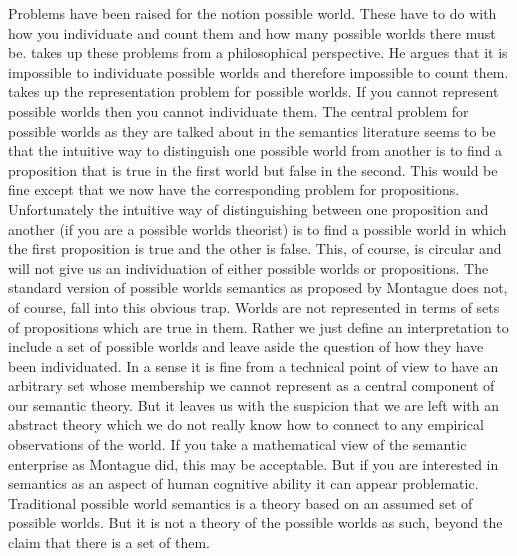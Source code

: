 Problems have been raised for the notion possible world. These have to
do with how you individuate and count them and how many possible
worlds there must be. \cite{Rescher1999} takes up these problems from
a philosophical perspective.  He argues that it is impossible to
individuate possible worlds and therefore impossible to count them.
\cite{Lappin2015} takes up the representation problem for possible
worlds.  If you cannot represent possible worlds then you cannot
individuate them.
The central problem for possible worlds as they are talked about in
the semantics literature seems to be that the intuitive way to
distinguish one possible world from another is to find a proposition
that is true in the first world but false in the second.  This would
be fine except that we now have the corresponding problem for
propositions.  Unfortunately the intuitive way of distinguishing
between one proposition and another (if you are a possible worlds
theorist) is to find a possible world in which the first proposition
is true and the other is false.  This, of course, is circular and will
not give us an individuation of either possible worlds or
propositions.  The standard version of possible worlds semantics as
proposed by Montague does not, of course, fall into this obvious trap.
Worlds are not represented in terms of sets of propositions which are
true in them.  Rather we just define an interpretation to include
a set of possible worlds and leave aside the question of how they
have been individuated.  In a sense it is fine from a technical
point of view to have an arbitrary set whose membership we cannot
represent as a central component of our semantic theory.  But it
leaves us with the suspicion that we are left with an abstract theory
which we do not really know how to connect to any empirical
observations of the world.  If you take a mathematical view of the
semantic enterprise as Montague did, this may be acceptable.  But if
you are interested in semantics as an aspect of human cognitive
ability it can appear problematic.  Traditional possible world
semantics is a theory based on an assumed set of possible worlds.  But
it is not a theory of the possible worlds as such, beyond the claim
that there is a set of them.

